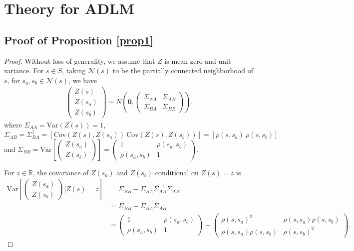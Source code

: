 \documentclass{article}
\newcommand{\Var}{\mathrm{Var}}
\newcommand{\Cov}{\mathrm{Cov}}
\begin{document}
\newpage
\appendix
\label{sec:headings}

\section{Theory for ADLM}
\label{appendix.a}
\subsection{Proof of Proposition \ref{prop1}\label{appendix.a1}}
\begin{proof}
Without loss of generality, we assume that $Z$ is mean zero and unit variance. For $s \in S$, taking $\mathcal{N}(s)$ to be the partially connected neighborhood of $s$, for $s_a, s_b \in \mathcal{N}(s)$, we have
\begin{align*}
    \begin{pmatrix} Z(s) \\ Z(s_a) \\ Z(s_b) \end{pmatrix} \sim N\left(\mathbf{0}, \begin{pmatrix} \Sigma_{AA} & \Sigma_{AB} \\ \Sigma_{BA} & \Sigma_{BB} \end{pmatrix}\right),
\end{align*}
where $\Sigma_{AA} = \Var(Z(s)) = 1$, $\Sigma_{AB} = \Sigma_{BA}^\top = \left[\Cov(Z(s), Z(s_a))\  \Cov(Z(s), Z(s_b))\right] = \left[\rho(s,s_a)\ \rho(s, s_b)\right]$ and $\Sigma_{BB} = \Var\left[\begin{pmatrix} Z(s_a) \\ Z(s_b) \end{pmatrix}\right] = \begin{pmatrix}
    1 & \rho(s_a, s_b) \\ \rho(s_a, s_b) & 1
    \end{pmatrix} $.

For $z \in \mathbb{R}$, the covariance of $Z(s_a)$ and $Z(s_b)$ conditional on $Z(s)=z$ is 
\begin{align*}
    \Var\left[\begin{pmatrix} Z(s_a) \\ Z(s_b) \end{pmatrix}\Bigg|Z(s) = z\right] &= \Sigma_{BB} - \Sigma_{BA}\Sigma_{AA}^{-1}\Sigma_{AB}\\ &= \Sigma_{BB} - \Sigma_{BA}\Sigma_{AB} \\ &= \begin{pmatrix}
    1 & \rho(s_a, s_b) \\ \rho(s_a, s_b) & 1
    \end{pmatrix} - \begin{pmatrix}
    \rho(s, s_a)^2 & \rho(s, s_a)\rho(s, s_b) \\ \rho(s, s_a)\rho(s, s_b) & \rho(s, s_b)^2
    \end{pmatrix}.
\end{align*}


\end{proof}
\end{document}
